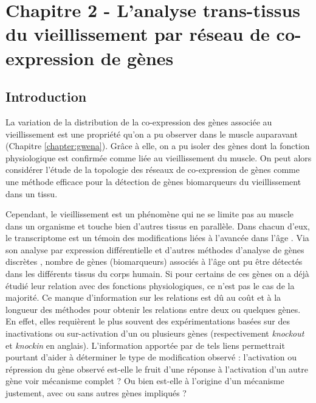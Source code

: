 \chapter{Chapitre 2 - L'analyse trans-tissus du vieillissement par réseau de co-expression de gènes}
\label{chapter:multidim}

\section{Introduction}

La variation de la distribution de la co-expression des gènes associée au vieillissement est une propriété qu'on a pu observer dans le muscle auparavant (Chapitre \ref{chapter:gwena}). Grâce à elle, on a pu isoler des gènes dont la fonction physiologique  est confirmée comme liée au vieillissement du muscle. On peut alors considérer l'étude de la topologie des réseaux de co-expression de gènes comme une méthode efficace pour la détection de gènes biomarqueurs du vieillissement dans un tissu. 

Cependant, le vieillissement est un phénomène qui ne se limite pas au muscle dans un organisme et touche bien d'autres tissus en parallèle. Dans chacun d'eux, le transcriptome est un témoin des modifications liées à l'avancée dans l'âge . Via son analyse par expression différentielle et d'autres méthodes d'analyse de gènes discrètes , nombre de gènes (biomarqueurs) associés à l'âge ont pu être détectés dans les différents tissus du corps humain. 
Si pour certains de ces gènes on a déjà étudié leur relation avec des fonctions physiologiques, ce n'est pas le cas de la majorité.
Ce manque d'information sur les relations est dû au coût et à la longueur des méthodes pour obtenir les relations entre deux ou quelques gènes. En effet, elles requièrent le plus souvent des expérimentations basées sur des inactivations ou sur-activation d'un ou plusieurs gènes (respectivement \textit{knockout} et \textit{knockin} en anglais). 
L'information apportée par de tels liens permettrait pourtant d'aider à déterminer le type de modification observé  : l'activation ou répression du gène observé est-elle le fruit d'une réponse à l'activation d'un autre gène voir mécanisme  complet ? Ou bien est-elle à l'origine d'un mécanisme justement, avec ou sans autres gènes impliqués ? 

